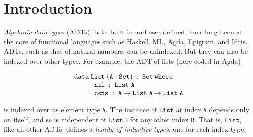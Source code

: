 \documentclass{lmcs}
\theoremstyle{plain}\newtheorem{satz}[thm]{Satz}
\begin{document}
\section{Introduction}\label{sec:intro}

{\em Algebraic data types} (ADTs), both built-in and user-defined,
have long been at the core of functional languages such as Haskell,
ML, Agda, Epigram, and Idris. ADTs, such as that of natural numbers,
can be unindexed. But they can also be indexed over other types. For
example, the ADT of lists (here coded in Agda)

\[\begin{array}{l}
\mathtt{data\; List \;(A : Set)\;:\;Set\;where}\\
\hspace*{0.4in}\mathtt{nil\;:\; List\;A}\\
\hspace*{0.4in}\mathtt{cons\;:\;A \rightarrow List\;A \rightarrow List\;A}
\end{array}\]

\noindent
is indexed over its element type $\mathtt{A}$.  The instance of
$\mathtt{List}$ at index $\mathtt{A}$ depends only on itself, and so is
independent of $\mathtt{List\,B}$ for any other index $\mathtt{B}$.
That is, $\mathtt{List}$, like all other ADTs, defines a {\em family
  of inductive types}, one for each index type.
\end{document}
